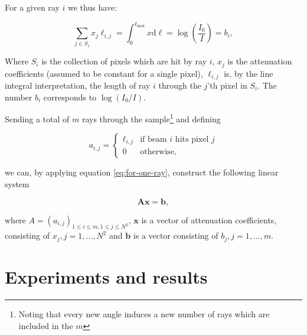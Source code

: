 \documentclass{article}
\begin{document}

For a given ray $i$ we thus have:

\begin{equation}\label{eq:for-one-ray}
    \sum_{j \in S_i} x_j \ell_{i, j} = \int_{0}^{\ell_{\max}}x \text{d} \ell = \log\left(\frac{I_0}{I}\right) = b_i,
\end{equation}

Where $S_i$ is the collection of pixels which are hit by ray $i$, $x_j$ is the attenuation coefficients (assumed to be constant for a single pixel), $\ell_{i, j}$ is, by the line integral interpretation, the length of ray $i$ through the $j$'th pixel in $S_i$. The number $b_i$ corresponds to $\log{(I_0 / I)}$. 

Sending a total of $m$ rays through the sample\footnote{Noting that every new angle induces a new number of rays which are included in the $m$}  and defining

\begin{equation}
    a_{i, j} = 
    \begin{cases}
        \ell_{i, j} & \text{if beam $i$ hits pixel $j$} \\
        0 & \text{otherwise,}
    \end{cases}
\end{equation}

we can, by applying equation \ref{eq:for-one-ray}, construct the following linear system

\begin{equation}
    \boldsymbol{A} \boldsymbol{x} = \boldsymbol{b},
\end{equation}

where $A = (a_{i,j})_{1 \leq i \leq m, 1 \leq j \leq N^2}$, $\boldsymbol{x}$ is a vector of attenuation coefficients, consisting of $x_j, j = 1, \dots, N^2$ and $\boldsymbol{b}$ is a vector consisting of $b_j, j = 1, \dots, m$. 

\section{Experiments and results}
\end{document}

